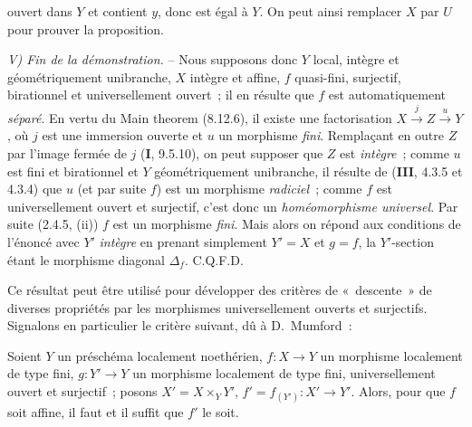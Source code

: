 
ouvert dans $Y$ et contient $y$, donc est égal à $Y$. On peut ainsi remplacer $X$
par $U$ pour prouver la proposition.

\emph{V) Fin de la démonstration.} -- Nous supposons donc $Y$ local, intègre et
géométriquement unibranche, $X$ intègre et affine, $f$ quasi-fini, surjectif,
birationnel et universellement ouvert~; il en résulte que $f$ est automatiquement
\emph{séparé}. En vertu du Main theorem (8.12.6), il existe une factorisation
$X\xrightarrow{j}Z\xrightarrow{u}Y$, où $j$ est une immersion ouverte et $u$ un
morphisme \emph{fini}. Remplaçant en outre $Z$ par l'image fermée de $j$
(\textbf{I}, 9.5.10), on peut supposer que $Z$ est \emph{intègre}~; comme $u$ est
fini et birationnel et $Y$ géométriquement unibranche, il résulte de
(\textbf{III}, 4.3.5 et 4.3.4) que $u$ (et par suite $f$) est un morphisme
\emph{radiciel}~; comme $f$ est universellement ouvert et surjectif, c'est donc un
\emph{homéomorphisme universel}. Par suite (2.4.5, (ii)) $f$ est un morphisme
\emph{fini}. Mais alors on répond aux conditions de l'énoncé avec $Y'$ \emph{intègre}
en prenant simplement $Y'=X$ et $g=f$, la $Y'$-section étant le morphisme diagonal
$\Delta_f$. C.Q.F.D.

Ce résultat peut être utilisé pour développer des critères de «~descente~» de
diverses propriétés par les morphismes universellement ouverts et surjectifs.
Signalons en particulier le critère suivant, dû à D.~Mumford~:

\begin{corollary}[14.5.11]
Soient $Y$ un préschéma localement noethérien, $f:X\to Y$ un morphisme localement
de type fini, $g:Y'\to Y$ un morphisme localement de type fini, universellement
ouvert et surjectif~; posons $X'=X\times_Y Y'$, $f'=f_{(Y')}:X'\to Y'$. Alors,
pour que $f$ soit affine, il faut et il suffit que $f'$ le soit.
\end{corollary}

